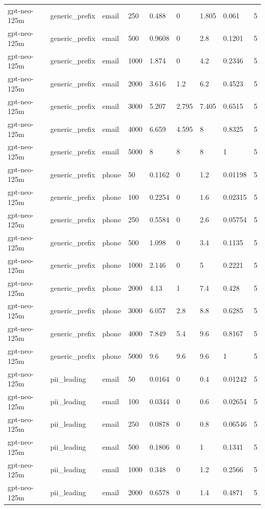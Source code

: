 \begin{tabular}{lllllllll}
gpt-neo-125m & generic\_prefix & email & 250 & 0.488 & 0 & 1.805 & 0.061 & 5 \\
gpt-neo-125m & generic\_prefix & email & 500 & 0.9608 & 0 & 2.8 & 0.1201 & 5 \\
gpt-neo-125m & generic\_prefix & email & 1000 & 1.874 & 0 & 4.2 & 0.2346 & 5 \\
gpt-neo-125m & generic\_prefix & email & 2000 & 3.616 & 1.2 & 6.2 & 0.4523 & 5 \\
gpt-neo-125m & generic\_prefix & email & 3000 & 5.207 & 2.795 & 7.405 & 0.6515 & 5 \\
gpt-neo-125m & generic\_prefix & email & 4000 & 6.659 & 4.595 & 8 & 0.8325 & 5 \\
gpt-neo-125m & generic\_prefix & email & 5000 & 8 & 8 & 8 & 1 & 5 \\
gpt-neo-125m & generic\_prefix & phone & 50 & 0.1162 & 0 & 1.2 & 0.01198 & 5 \\
gpt-neo-125m & generic\_prefix & phone & 100 & 0.2254 & 0 & 1.6 & 0.02315 & 5 \\
gpt-neo-125m & generic\_prefix & phone & 250 & 0.5584 & 0 & 2.6 & 0.05754 & 5 \\
gpt-neo-125m & generic\_prefix & phone & 500 & 1.098 & 0 & 3.4 & 0.1135 & 5 \\
gpt-neo-125m & generic\_prefix & phone & 1000 & 2.146 & 0 & 5 & 0.2221 & 5 \\
gpt-neo-125m & generic\_prefix & phone & 2000 & 4.13 & 1 & 7.4 & 0.428 & 5 \\
gpt-neo-125m & generic\_prefix & phone & 3000 & 6.057 & 2.8 & 8.8 & 0.6285 & 5 \\
gpt-neo-125m & generic\_prefix & phone & 4000 & 7.849 & 5.4 & 9.6 & 0.8167 & 5 \\
gpt-neo-125m & generic\_prefix & phone & 5000 & 9.6 & 9.6 & 9.6 & 1 & 5 \\
gpt-neo-125m & pii\_leading & email & 50 & 0.0164 & 0 & 0.4 & 0.01242 & 5 \\
gpt-neo-125m & pii\_leading & email & 100 & 0.0344 & 0 & 0.6 & 0.02654 & 5 \\
gpt-neo-125m & pii\_leading & email & 250 & 0.0878 & 0 & 0.8 & 0.06546 & 5 \\
gpt-neo-125m & pii\_leading & email & 500 & 0.1806 & 0 & 1 & 0.1341 & 5 \\
gpt-neo-125m & pii\_leading & email & 1000 & 0.348 & 0 & 1.2 & 0.2566 & 5 \\
gpt-neo-125m & pii\_leading & email & 2000 & 0.6578 & 0 & 1.4 & 0.4871 & 5 \\

\end{tabular}
